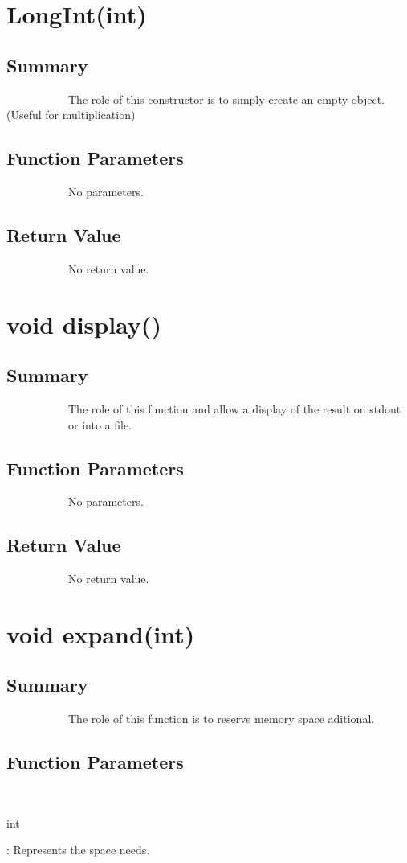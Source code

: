\documentclass[11pt]{report}
\begin{document}
    \section{LongInt(int)}
   
	\subsection{Summary}
~~~~~~~~~~~The role of this constructor is to simply create an empty object. (Useful for multiplication)
	\subsection{Function Parameters}
~~~~~~~~~~~No parameters.
	\subsection{Return Value}
~~~~~~~~~~~No return value.
    
    \section{void display()}
  
	\subsection{Summary}
~~~~~~~~~~~The role of this function and allow a display of the result on stdout\\
~~~~~~~~~~~or into a file.
	\subsection{Function Parameters}
~~~~~~~~~~~No parameters.
	\subsection{Return Value}
~~~~~~~~~~~No return value.
	  
    \section{void expand(int)}
  
	\subsection{Summary}
~~~~~~~~~~~The role of this function is to reserve memory space aditional.
	\subsection{Function Parameters}
~~~~~~~~~~~\begin{bf}int\end{bf}: Represents the space needs.
\end{document}
